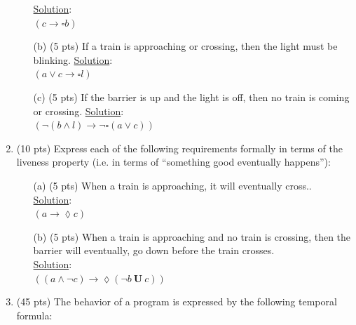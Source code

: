 \documentclass[12pt]{article}
\begin{document}
\begin{enumerate}
\begin{itemize}
\noindent \underline{Solution}:\\ 
\square $(c \rightarrow \square b)$
\item[(b)] (5 pts) If a train is approaching or crossing, then the light must be blinking.
\noindent \underline{Solution}:\\
\square $(a \vee c \rightarrow \square l)$
\item[(c)] (5 pts) If the barrier is up and the light is off, then no train is coming or crossing.
\noindent \underline{Solution}:\\
\square $(\lnot(b \wedge l) \rightarrow \lnot \square(a \vee c)) $
\end{itemize}
\item (10 pts) Express each of the following requirements formally in terms of the liveness
property (i.e. in terms of “something good eventually happens”):
\begin{itemize}
\item[(a)] (5 pts) When a train is approaching, it will eventually cross.. \\
\noindent \underline{Solution}:\\
\square $(a \rightarrow \lozenge c) $
\item[(b)] (5 pts) When a train is approaching and no train is crossing, then the barrier will
eventually, go down before the train crosses. \\
\noindent \underline{Solution}:\\
\square $((a \wedge \lnot c) \rightarrow \lozenge(\lnot b \ \textbf{U} \ c)) $
\end{itemize}
\newpage
\item (45 pts) The behavior of a program is expressed by the following temporal formula:\\
\begin{figure}[h!]
\centering

\end{figure}
\end{enumerate}
\end{document}
